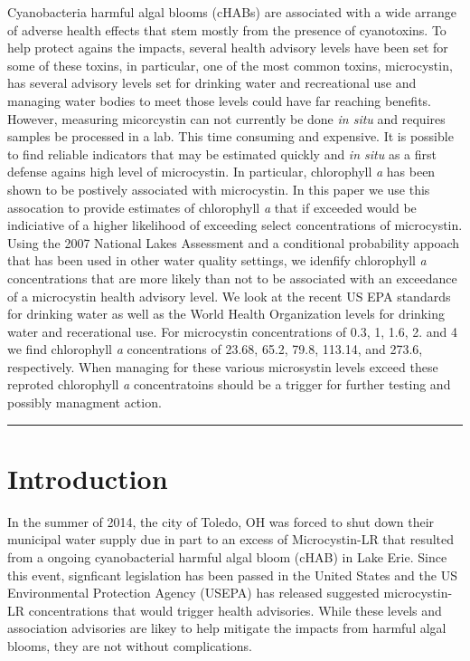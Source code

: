 \documentclass[11pt,]{article}
\begin{document}
Cyanobacteria harmful algal blooms (cHABs) are associated with a wide
arrange of adverse health effects that stem mostly from the presence of
cyanotoxins. To help protect agains the impacts, several health advisory
levels have been set for some of these toxins, in particular, one of the
most common toxins, microcystin, has several advisory levels set for
drinking water and recreational use and managing water bodies to meet
those levels could have far reaching benefits. However, measuring
micorcystin can not currently be done \emph{in situ} and requires
samples be processed in a lab. This time consuming and expensive. It is
possible to find reliable indicators that may be estimated quickly and
\emph{in situ} as a first defense agains high level of microcystin. In
particular, chlorophyll \emph{a} has been shown to be postively
associated with microcystin. In this paper we use this assocation to
provide estimates of chlorophyll \emph{a} that if exceeded would be
indiciative of a higher likelihood of exceeding select concentrations of
microcystin. Using the 2007 National Lakes Assessment and a conditional
probability appoach that has been used in other water quality settings,
we idenfify chlorophyll \emph{a} concentrations that are more likely
than not to be associated with an exceedance of a microcystin health
advisory level. We look at the recent US EPA standards for drinking
water as well as the World Health Organization levels for drinking water
and recerational use. For microcystin concentrations of 0.3, 1, 1.6, 2.
and 4 we find chlorophyll \emph{a} concentrations of 23.68, 65.2, 79.8,
113.14, and 273.6, respectively. When managing for these various
microsystin levels exceed these reproted chlorophyll \emph{a}
concentratoins should be a trigger for further testing and possibly
managment action.

\vspace{3mm}

\hrule

\doublespace

\section{Introduction}\label{introduction}

In the summer of 2014, the city of Toledo, OH was forced to shut down
their municipal water supply due in part to an excess of Microcystin-LR
that resulted from a ongoing cyanobacterial harmful algal bloom (cHAB)
in Lake Erie. Since this event, signficant legislation has been passed
in the United States and the US Environmental Protection Agency (USEPA)
has released suggested microcystin-LR concentrations that would trigger
health advisories. While these levels and association advisories are
likey to help mitigate the impacts from harmful algal blooms, they are
not without complications.
\end{document}
